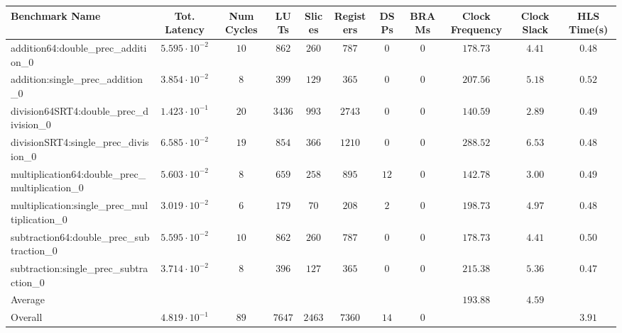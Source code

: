 \begin{tabular}{|l|c|c|c|c|c|c|c|c|c|c|}
\hline
Benchmark Name                                   & Tot. Latency            & Num Cycles & LUTs     & Slices   & Registers & DSPs   & BRAMs & Clock Frequency & Clock Slack & HLS Time(s) \\
\hline
addition64:double\_prec\_addition\_0             & $ 5.595 \cdot 10^{-2} $ & $ 10     $ & $ 862  $ & $ 260  $ & $ 787   $ & $ 0  $ & $ 0 $ & $ 178.73      $ & $ 4.41    $ & $ 0.48    $ \\
addition:single\_prec\_addition\_0               & $ 3.854 \cdot 10^{-2} $ & $ 8      $ & $ 399  $ & $ 129  $ & $ 365   $ & $ 0  $ & $ 0 $ & $ 207.56      $ & $ 5.18    $ & $ 0.52    $ \\
division64SRT4:double\_prec\_division\_0         & $ 1.423 \cdot 10^{-1} $ & $ 20     $ & $ 3436 $ & $ 993  $ & $ 2743  $ & $ 0  $ & $ 0 $ & $ 140.59      $ & $ 2.89    $ & $ 0.49    $ \\
divisionSRT4:single\_prec\_division\_0           & $ 6.585 \cdot 10^{-2} $ & $ 19     $ & $ 854  $ & $ 366  $ & $ 1210  $ & $ 0  $ & $ 0 $ & $ 288.52      $ & $ 6.53    $ & $ 0.48    $ \\
multiplication64:double\_prec\_multiplication\_0 & $ 5.603 \cdot 10^{-2} $ & $ 8      $ & $ 659  $ & $ 258  $ & $ 895   $ & $ 12 $ & $ 0 $ & $ 142.78      $ & $ 3.00    $ & $ 0.49    $ \\
multiplication:single\_prec\_multiplication\_0   & $ 3.019 \cdot 10^{-2} $ & $ 6      $ & $ 179  $ & $ 70   $ & $ 208   $ & $ 2  $ & $ 0 $ & $ 198.73      $ & $ 4.97    $ & $ 0.48    $ \\
subtraction64:double\_prec\_subtraction\_0       & $ 5.595 \cdot 10^{-2} $ & $ 10     $ & $ 862  $ & $ 260  $ & $ 787   $ & $ 0  $ & $ 0 $ & $ 178.73      $ & $ 4.41    $ & $ 0.50    $ \\
subtraction:single\_prec\_subtraction\_0         & $ 3.714 \cdot 10^{-2} $ & $ 8      $ & $ 396  $ & $ 127  $ & $ 365   $ & $ 0  $ & $ 0 $ & $ 215.38      $ & $ 5.36    $ & $ 0.47    $ \\
\hline
Average                                          & $                     $ & $        $ & $      $ & $      $ & $       $ & $    $ & $   $ & $ 193.88      $ & $ 4.59    $ & $         $ \\
\hline
Overall                                          & $ 4.819 \cdot 10^{-1} $ & $ 89     $ & $ 7647 $ & $ 2463 $ & $ 7360  $ & $ 14 $ & $ 0 $ & $             $ & $         $ & $ 3.91    $ \\
\hline
\end{tabular}
